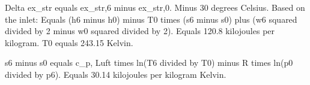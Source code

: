 Delta ex_str equals ex_str,6 minus ex_str,0.  
Minus 30 degrees Celsius.  
Based on the inlet:  
Equals (h6 minus h0) minus T0 times (s6 minus s0) plus (w6 squared divided by 2 minus w0 squared divided by 2).  
Equals 120.8 kilojoules per kilogram.  
T0 equals 243.15 Kelvin.  

s6 minus s0 equals c_p, Luft times ln(T6 divided by T0) minus R times ln(p0 divided by p6).  
Equals 30.14 kilojoules per kilogram Kelvin.